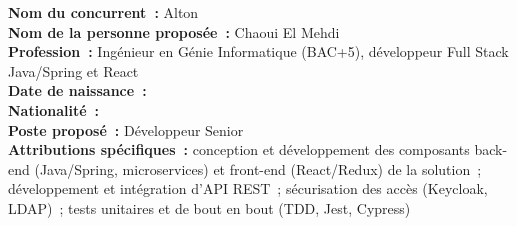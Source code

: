\noindent\textbf{Nom du concurrent~:} Alton\\
\textbf{Nom de la personne proposée~:} Chaoui El Mehdi\\
\textbf{Profession~:} Ingénieur en Génie Informatique (BAC+5), développeur Full Stack Java/Spring et React\\
\textbf{Date de naissance~:} \makebox[5cm]{\dotfill}\\
\textbf{Nationalité~:} \makebox[5cm]{\dotfill}\\
\textbf{Poste proposé~:} Développeur Senior\\
\textbf{Attributions spécifiques~:} conception et développement des composants back-end (Java/Spring, microservices) et front-end (React/Redux) de la solution~; développement et intégration d'API REST~; sécurisation des accès (Keycloak, LDAP)~; tests unitaires et de bout en bout (TDD, Jest, Cypress)
